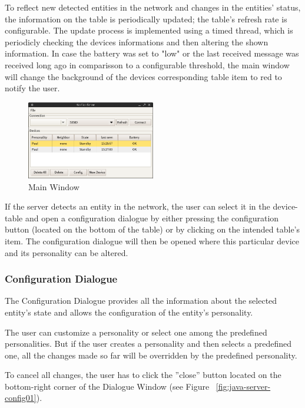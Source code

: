 To reflect new detected entities in the network and changes in the entities' status, the information on the table is periodically updated; the table's refresh rate is configurable. 
The update process is implemented using a timed thread, which is periodicly checking the devices informations and then altering the shown information. In case the battery was set to "low" or the last received message was received long ago in comparisson to a configurable threshold, the main window will change the background of the devices corresponding table item to red to notify the user. 
\begin{figure}[h!]
 \centering
 \includegraphics[width= 0.5\textwidth, clip=true  ,keepaspectratio=true]{./pic/java-server-main.png}
 \caption{Main Window}
 \label{java-server-main}
\end{figure}

If the server detects an entity in the network, the user can select it in the device-table and open a configuration dialogue by either pressing the configuration button (located on the bottom of the table) or by clicking on the intended table's item. The configuration dialogue will then be opened where this particular device and its personality can be altered.


\subsubsection{Configuration Dialogue}

The Configuration Dialogue provides all the information about the selected entity's state and allows the configuration of the entity's personality. 

The user can customize a personality or select one among the predefined personalities. But if the user creates a personality and then selects a predefined one, all the changes made so far will be overridden by the predefined personality. 

To cancel all changes, the user has to click the ''close'' button located on the bottom-right corner of the Dialogue Window (see Figure ~\ref{fig:java-server-config01}).   


